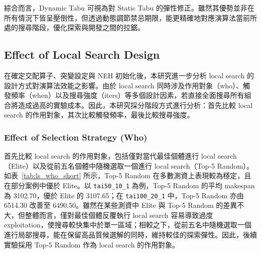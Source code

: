 \documentclass[conference]{IEEEtran}
\begin{document}
綜合而言，Dynamic Tabu 可視為對 Static Tabu 的彈性修正。雖然其優勢並非在所有情況下皆呈壓倒性，但透過動態調節禁忌期限，能更精確地對應演算法當前所處的搜尋階段，優化探索與開發之間的拉鋸。

\subsection{Effect of Local Search Design}
在確定交配算子、突變設定與 NEH 初始化後，本研究進一步分析 local search 的設計方式對演算法效能之影響。由於 local search 同時涉及作用對象（who）、觸發頻率（when）以及搜尋強度（iters）等多個設計因素，若直接全面搜尋所有組合將造成過高的實驗成本。因此，本研究採分階段方式進行分析：首先比較 local search 的作用對象，其次比較觸發頻率，最後比較搜尋強度。

\subsubsection{Effect of Selection Strategy (Who)}
首先比較 local search 的作用對象，包括僅對當代最佳個體進行 local search（Elite）以及從前五名個體中隨機選取一個進行 local search（Top-5 Random）。如表~\ref{tab:ls_who_short} 所示，Top-5 Random 在多數測資上表現較為穩定，且在部分案例中優於 Elite。以 \texttt{tai50\_10\_1} 為例，Top-5 Random 的平均 makespan 為 3102.70，優於 Elite 的 3107.65；在 \texttt{tai100\_20\_1} 中，Top-5 Random 亦由 6514.30 改善至 6490.50。雖然在某些測資中 Elite 與 Top-5 Random 的差異不大，但整體而言，僅對最佳個體反覆執行 local search 容易導致過度 exploitation，使搜尋較快集中於單一區域；相較之下，從前五名中隨機選取一個進行局部搜尋，能在保留高品質候選解的同時，維持較佳的探索彈性。因此，後續實驗採用 Top-5 Random 作為 local search 的作用對象。
\end{document}
